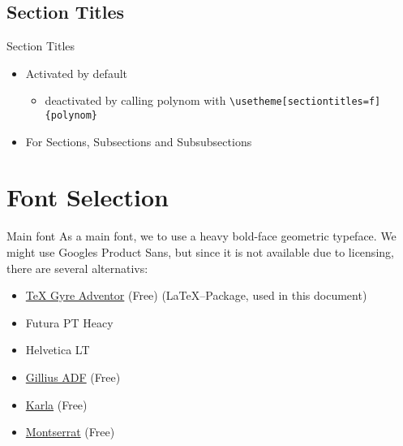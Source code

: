 \documentclass[fragile=singleslide]{beamer}
\begin{document}
\subsection{Section Titles}
\begin{frame}{Section Titles}
  \begin{itemize}
  \item Activated by default
    \begin{itemize}
    \item deactivated by calling polynom with \texttt{\textbackslash usetheme[sectiontitles=f]\{polynom\}}
    \end{itemize}
  \item For Sections, Subsections and Subsubsections
  \end{itemize}
\end{frame}



\section{Font Selection}
\begin{frame}{Main font}
  As a main font, we to use a heavy bold-face geometric typeface.  We
  might use Googles Product Sans, but since it is not available due to
  licensing, there are several alternativs:  
  \begin{itemize}
  \item \href{http://www.tug.dk/FontCatalogue/texgyreadventor/}{\TeX
      Gyre Adventor} (Free) (\LaTeX--Package, used in this document)
  \item Futura PT Heacy
  \item Helvetica LT
  \item \href{https://www.1001fonts.com/gillius-adf-font.html}{Gillius
      ADF} (Free)
  \item \href{https://fonts.google.com/specimen/Karla}{Karla} (Free)
  \item \href{https://fonts.google.com/specimen/Montserrat}{Montserrat} (Free)
  \end{itemize}
\end{frame}
\end{document}
